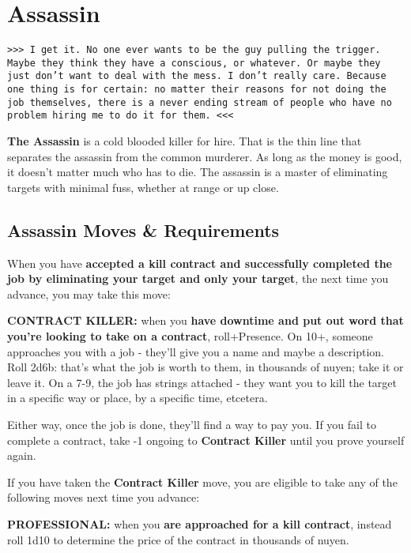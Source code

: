 \documentclass[oneside,10pt]{article}
\begin{document}
\section{Assassin}
\begin{multicols}{2}


\texttt{>>> I get it. No one ever wants to be the guy pulling the trigger. Maybe they think they have a conscious, or whatever. Or maybe they just don't want to deal with the mess. I don't really care. Because one thing is for certain: no matter their reasons for not doing the job themselves, there is a never ending stream of people who have no problem hiring me to do it for them. <<<}

\textbf{The Assassin} is a cold blooded killer for hire. That is the thin line that separates the assassin from the common murderer. As long as the money is good, it doesn't matter much who has to die. The assassin is a master of eliminating targets with minimal fuss, whether at range or up close. 

\subsection{Assassin Moves \& Requirements}

When you have \textbf{accepted a kill contract and successfully completed the job by eliminating your target and only your target}, the next time you advance, you may take this move:

\textbf{CONTRACT KILLER:} when you \textbf{have downtime and put out word that you’re looking to take on a contract}, roll+Presence. On 10+, someone approaches you with a job - they’ll give you a name and maybe a description. Roll 2d6b: that’s what the job is worth to them, in thousands of nuyen; take it or leave it. On a 7-9, the job has strings attached - they want you to kill the target in a specific way or place, by a specific time, etcetera.

 Either way, once the job is done, they'll find a way to pay you. If you fail to complete a contract, take -1 ongoing to \textbf{Contract Killer} until you prove yourself again.

If you have taken the \textbf{Contract Killer}
move, you are eligible to take any of the
following moves next time you advance:

\textbf{PROFESSIONAL:} when you \textbf{are
  approached for a kill contract}, instead roll
1d10 to determine the price of the contract in
thousands of nuyen. 


\end{multicols}
\end{document}
